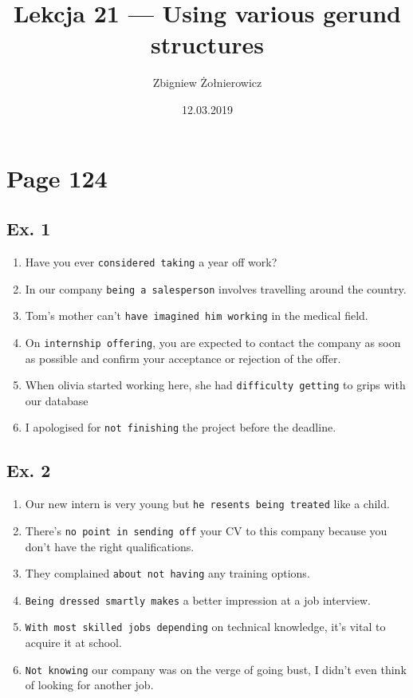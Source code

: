 \documentclass[a4paper]{article}
\begin{document}
\title{Lekcja 21 --- Using various gerund structures}
\author{Zbigniew Żołnierowicz}
\date{12.03.2019}
\maketitle

\section{Page 124}

\subsection{Ex. 1}

\begin{enumerate}
  \item Have you ever {\tt considered taking} a year off work?
  \item In our company {\tt being a salesperson} involves travelling around the country.
  \item Tom's mother can't {\tt have imagined him working} in the medical field.
  \item On {\tt internship offering}, you are expected to contact the company as soon as possible and confirm your acceptance or rejection of the offer.
  \item When olivia started working here, she had {\tt difficulty getting} to grips with our database
  \item I apologised for {\tt not finishing} the project before the deadline.
\end{enumerate}

\subsection{Ex. 2}
\begin{enumerate}
  \item Our new intern is very young but {\tt he resents being treated} like a child.
  \item There's {\tt no point in sending off} your CV to this company because you don't have the right qualifications.
  \item They complained {\tt about not having} any training options.
  \item {\tt Being dressed smartly makes} a better impression at a job interview.
  \item {\tt With most skilled jobs depending} on technical knowledge, it's vital to acquire it at school.
  \item {\tt Not knowing} our company was on the verge of going bust, I didn't even think of looking for another job.
\end{enumerate}
\end{document}
